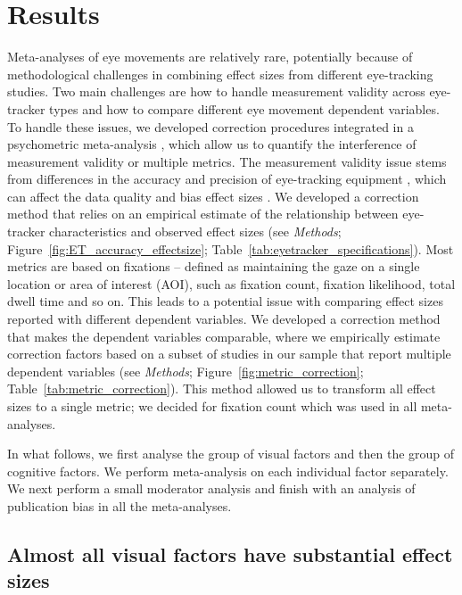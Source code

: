 
\section{Results}

Meta-analyses of eye movements are relatively rare, potentially because of methodological challenges in combining effect sizes from different eye-tracking studies. Two main challenges are how to handle measurement validity across eye-tracker types and how to compare different eye movement dependent variables. To handle these issues, we developed correction procedures integrated in a psychometric meta-analysis \citep{hunter2004a}, which allow us to quantify the interference of measurement validity or multiple metrics. The measurement validity issue stems from differences in the accuracy and precision of eye-tracking equipment \citep{holmqvist2015a}, which can affect the data quality and bias effect sizes \citep{orquin2016a}. We developed a correction method that relies on an empirical estimate of the relationship between eye-tracker characteristics and observed effect sizes (see \textit{Methods}; Figure~\ref{fig:ET_accuracy_effectsize}; Table~\ref{tab:eyetracker_specifications}). Most metrics are based on fixations -- defined as maintaining the gaze on a single location or area of interest (AOI), such as fixation count, fixation likelihood, total dwell time and so on. This leads to a potential issue with comparing effect sizes reported with different dependent variables. We developed a correction method that makes the dependent variables comparable, where we empirically estimate correction factors based on a subset of studies in our sample that report multiple dependent variables (see \textit{Methods}; Figure~\ref{fig:metric_correction}; Table~\ref{tab:metric_correction}). This method allowed us to transform all effect sizes to a single metric; we decided for fixation count which was used in all meta-analyses. 

In what follows, we first analyse the group of visual factors and then the group of cognitive factors. We perform meta-analysis on each individual factor  separately. We next perform a small moderator analysis and finish with an analysis of publication bias in all the meta-analyses.  



\subsection{Almost all visual factors have substantial effect sizes}

